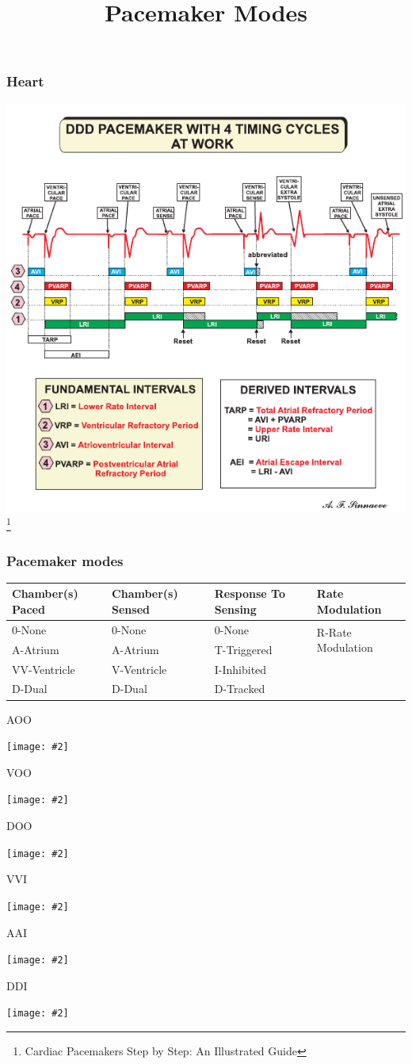 \documentclass[xcolor=dvipsnames]{beamer}
\title[Pacemaker modes]{Pacemaker Modes}
\newcommand {\framedgraphic}[2] {
    \begin{frame}{#1}
        \begin{center}
            \texttt{[image: \#2]}
        \end{center}
    \end{frame}
}
\begin{document}
  \begin{frame}
    \frametitle{Heart}
        \begin{center}
            \includegraphics[width=\textwidth,height=0.8\textheight,keepaspectratio]{../Figures/intervals.png}
        \footnote{Cardiac Pacemakers Step by Step: An Illustrated Guide}
        \end{center}
  \end{frame}


  \begin{frame}{}
    \frametitle{Pacemaker modes}
    \begin{tabularx}{\textwidth}{|X|X|X|X|}
      \hline
              Chamber(s) Paced & Chamber(s) Sensed & Response To Sensing & Rate Modulation  \\ \hline
              0-None           & 0-None            & 0-None              & \multirow{2}{2cm}{R-Rate Modulation}  \\ %
              A-Atrium         & A-Atrium          & T-Triggered         &                    \\ %
              VV-Ventricle      & V-Ventricle       & I-Inhibited         &                    \\ %
              D-Dual           & D-Dual            & D-Tracked           &                  \\
      \hline
    \end{tabularx}

  \end{frame}



    \framedgraphic{AOO}{../Modes/AOO.png}

    \framedgraphic{VOO}{../Modes/VOO.png}
    \framedgraphic{DOO}{../Modes/DOO.png}
    \framedgraphic{VVI}{../Modes/VVI.png}
    \framedgraphic{AAI}{../Modes/AAI.png}
    \framedgraphic{DDI}{../Modes/DDI.png}
  
\end{document}
